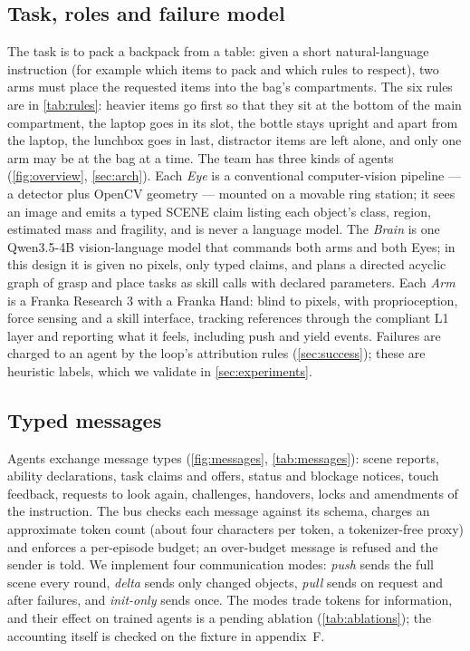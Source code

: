 \subsection{Task, roles and failure model}\label{sec:task}
The task is to pack a backpack from a table: given a short natural-language instruction (for example which items to pack and which rules to respect), two arms must place the requested items into the bag's compartments.
The six rules are in \cref{tab:rules}: heavier items go first so that they sit at the bottom of the main compartment, the laptop goes in its slot, the bottle stays upright and apart from the laptop, the lunchbox goes in last, distractor items are left alone, and only one arm may be at the bag at a time.
The team has three kinds of agents (\cref{fig:overview}, \cref{sec:arch}).
Each \emph{Eye} is a conventional computer-vision pipeline --- a detector plus OpenCV geometry --- mounted on a movable ring station; it sees an image and emits a typed SCENE claim listing each object's class, region, estimated mass and fragility, and is never a language model.
The \emph{Brain} is one Qwen3.5-4B vision-language model that commands both arms and both Eyes; in this design it is given no pixels, only typed claims, and plans a directed acyclic graph of grasp and place tasks as skill calls with declared parameters.
Each \emph{Arm} is a Franka Research 3 with a Franka Hand: blind to pixels, with proprioception, force sensing and a skill interface, tracking references through the compliant L1 layer and reporting what it feels, including push and yield events.
Failures are charged to an agent by the loop's attribution rules (\cref{sec:success}); these are heuristic labels, which we validate in \cref{sec:experiments}.

\begin{table}[tbp]
\centering\small

\caption{The six rules the team must satisfy; the text is the harness file the Brain retrieves (\cref{sec:harness}).}
\label{tab:rules}
\end{table}

\subsection{Typed messages}\label{sec:bus}
Agents exchange \nMsgTypes{} message types (\cref{fig:messages}, \cref{tab:messages}): scene reports, ability declarations, task claims and offers, status and blockage notices, touch feedback, requests to look again, challenges, handovers, locks and amendments of the instruction.
The bus checks each message against its schema, charges an approximate token count (about four characters per token, a tokenizer-free proxy) and enforces a per-episode budget; an over-budget message is refused and the sender is told.
We implement four communication modes: \emph{push} sends the full scene every round, \emph{delta} sends only changed objects, \emph{pull} sends on request and after failures, and \emph{init-only} sends once.
The modes trade tokens for information, and their effect on trained agents is a pending ablation (\cref{tab:ablations}); the accounting itself is checked on the fixture in appendix~F.

